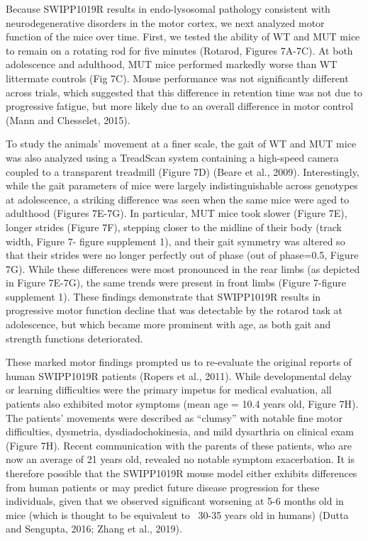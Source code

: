 Because SWIPP1019R results in endo-lysosomal pathology
consistent with neurodegenerative disorders in the motor cortex, we next
analyzed motor function of the mice over time. First, we tested the ability of
WT and MUT mice to remain on a rotating rod for five minutes (Rotarod, Figures
7A-7C). At both adolescence and adulthood, MUT mice performed markedly worse
than WT littermate controls (Fig 7C). Mouse performance was not significantly
different across trials, which suggested that this difference in retention time
was not due to progressive fatigue, but more likely due to an overall difference
in motor control (Mann and Chesselet, 2015).

To study the animals’ movement at a finer scale, the gait of WT and MUT mice was
also analyzed using a TreadScan system containing a high-speed camera coupled to
a transparent treadmill (Figure 7D) (Beare et al., 2009). Interestingly, while
the gait parameters of mice were largely indistinguishable across genotypes at
adolescence, a striking difference was seen when the same mice were aged to
adulthood (Figures 7E-7G). In particular, MUT mice took slower (Figure 7E),
longer strides (Figure 7F), stepping closer to the midline of their body (track
width, Figure 7- figure supplement 1), and their gait symmetry was altered so
that their strides were no longer perfectly out of phase (out of phase=0.5,
Figure 7G). While these differences were most pronounced in the rear limbs (as
depicted in Figure 7E-7G), the same trends were present in front limbs (Figure
7-figure supplement 1). These findings demonstrate that SWIPP1019R results in
progressive motor function decline that was detectable by the rotarod task at
adolescence, but which became more prominent with age, as both gait and strength
functions deteriorated.  

These marked motor findings prompted us to re-evaluate the original reports of
human SWIPP1019R patients (Ropers et al., 2011). While developmental delay or
learning difficulties were the primary impetus for medical evaluation, all
patients also exhibited motor symptoms (mean age = 10.4 years old, Figure 7H).
The patients’ movements were described as “clumsy” with notable fine motor
difficulties, dysmetria, dysdiadochokinesia, and mild dysarthria on clinical
exam (Figure 7H). Recent communication with the parents of these patients, who
are now an average of 21 years old, revealed no notable symptom exacerbation. It
is therefore possible that the SWIPP1019R mouse model either exhibits
differences from human patients or may predict future disease progression for
these individuals, given that we observed significant worsening at 5-6 months
old in mice (which is thought to be equivalent to ~30-35 years old in humans)
(Dutta and Sengupta, 2016; Zhang et al., 2019).
